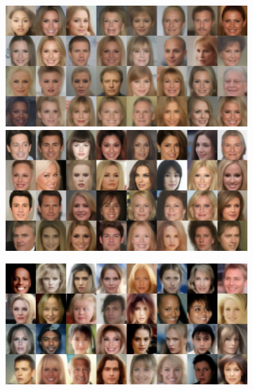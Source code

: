 \documentclass{article}
\begin{document}
\begin{figure}
  \begin{subfigure}{0.495\textwidth}
    \includegraphics[width=\linewidth]{figs/imgs/ddpm_ddpm_celeba64_data_samples_T_800_5_steps_32_rec.jpg}
     \includegraphics[width=\linewidth]{figs/imgs/ddpm_ddpm_celeba64_data_samples_T_800_10_steps_32_rec.jpg}
    \label{subfig:ddpm_celeba64}
  \end{subfigure}
  \begin{subfigure}{0.495\textwidth}
    \includegraphics[width=\linewidth]{figs/imgs/ddpm_ddpm_celeba64_data_samples_T_400_5_steps_ga_32_rec.jpg}

\end{subfigure}
\end{figure}
\end{document}
